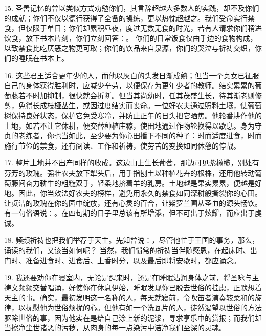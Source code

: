 15. 圣善记忆的曾以类似方式劝勉你们，其言辞超越大多数人的实践，却不及你们的成就；你们不仅以德行获得了全备的操练，更以热忱超越之。我们受命实行禁食，但仅限于单日；你们却累积昼夜，度过无数无食的时光，若有人请求你们稍进饮食，放下书本片刻，你们立刻回答：。 你们的日常饭食仅由手边的食物构成，以致禁食比吃厌恶之物更可取；你们的饮品来自泉源，你们的哭泣与祈祷交织，你们的睡眠在书本上。\par

16. 这些君王适合更年少的人，而他以灰白的头发日渐成熟；但当一个贞女已征服自己的身体获得胜利时，应减少辛劳，以便保存为更年少者的教师。结实累累的葡萄藤若不时加抑制，很快就会折断。但当其尚幼时，任其茂盛生长，待其渐老则修剪，免得长成枝桠丛生，或因过度结实而丧命。一位好农夫通过照料土壤，使葡萄树保持良好状态，保护它免受寒冷，并防止正午的日头把它晒焦。他轮番耕作他的土地，如若不让它休耕，便交替种植庄稼，使田地通过作物轮换得以歇息。身为守贞的老练者，你也当如此，至少要为你心田播下不同的种子：时而适度进食，时而施行节俭的禁食，还有阅读、工作和祈祷，使劳苦的变换如同休憩的停战。\par

17. 整片土地并不出产同样的收成。这边山上生长葡萄，那边可见紫橄榄，别处有芬芳的玫瑰。强壮农夫放下犁头后，用手指刨土以种植花卉的根株，还用他转动葡萄藤间奋力耕牛的粗糙双手，轻柔地挤着羊的乳房。土地越是果实累累，便越是好地。因此，你当效法好农夫的榜样，避免用永久的禁食如同深耕般撕裂你的心田。让贞洁的玫瑰在你的园中绽放，还有心灵的百合，让紫罗兰圃从圣血的源头畅饮。有一句俗语说：。在四旬期的日子里总该有所增添，但不可出于炫耀，而应出于虔诚。\par

18. 频频祈祷也把我们举荐于天主。先知曾说：，尽管他忙于王国的事务，那么，诵读的我们，又该当如何呢？ 当然，我们惯常的祈祷当伴随感恩，在起床时、出门时、准备进食时、进食后、上香时分，以及最后即将安歇时，都应诵念。\par

19. 我还要劝你在寝室内，无论是醒来时，还是在睡眠沾润身体之前，将圣咏与主祷文频频交替唱诵，好使你在休息伊始，睡眠发现你已脱去世俗的挂虑，正默想着天主的事。确实，最初发明这一名称的人，每天就寝前，令吹笛者演奏较柔和的旋律，以抚慰他为世俗烦扰的心。但他有如一个洗瓦片的人，徒然渴望以世俗的方法驱除世俗的事，因为他实在是给自己涂上新的泥浆，寻求享乐中的赏报；而我们却当擦净尘世诸恶的污秽，从肉身的每一点染污中洁净我们至深的灵魂。\par

